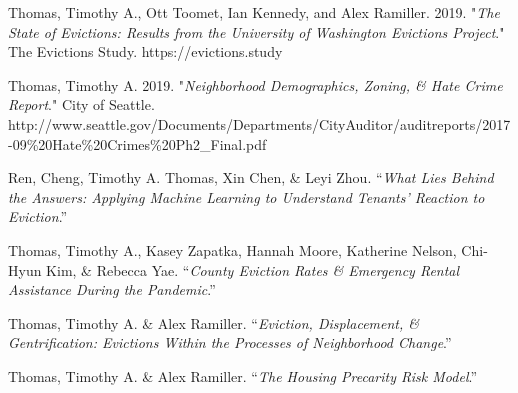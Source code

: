 \begin{cvparagraph}

Thomas, Timothy A., Ott Toomet, Ian Kennedy, and Alex Ramiller. 2019. "\emph{The State of Evictions: Results from the University of Washington Evictions Project}." The Evictions Study. https://evictions.study
\end{cvparagraph}

\begin{cvparagraph}

Thomas, Timothy A. 2019. "\emph{Neighborhood Demographics, Zoning, & Hate Crime Report}." City of Seattle.\\
http://www.seattle.gov/Documents/Departments/CityAuditor/auditreports/2017-09\%20Hate\%20Crimes\%20Ph2\_Final.pdf
\end{cvparagraph}

\begin{cvparagraph}


Ren, Cheng, Timothy A. Thomas, Xin Chen, \& Leyi Zhou. “\emph{What Lies Behind the Answers: Applying Machine Learning to Understand Tenants’ Reaction to Eviction}.”

\end{cvparagraph}

\begin{cvparagraph}


Thomas, Timothy A., Kasey Zapatka, Hannah Moore, Katherine Nelson, Chi-Hyun Kim, \& Rebecca Yae. “\emph{County Eviction Rates \& Emergency Rental Assistance During the Pandemic}.”

\end{cvparagraph}


\begin{cvparagraph}

Thomas, Timothy A. \& Alex Ramiller. “\emph{Eviction, Displacement, \& Gentrification: Evictions Within the Processes of Neighborhood Change}.”
\end{cvparagraph}

\begin{cvparagraph}


Thomas, Timothy A. \& Alex Ramiller. “\emph{The Housing Precarity Risk Model}.”

\end{cvparagraph}